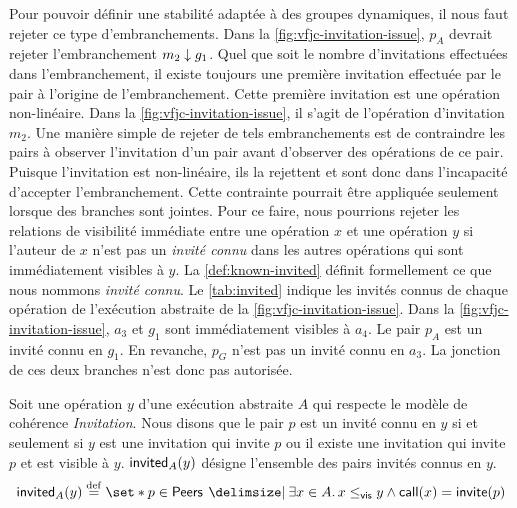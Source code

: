 Pour pouvoir définir une stabilité adaptée à des groupes dynamiques, il nous faut rejeter ce type d'embranchements.
Dans la \autoref{fig:vfjc-invitation-issue}, $p_A$ devrait rejeter l'embranchement $m_2 \downarrow g_1$.
Quel que soit le nombre d'invitations effectuées dans l'embranchement, il existe toujours une première invitation effectuée par le pair à l'origine de l'embranchement.
Cette première invitation est une opération non-linéaire.
Dans la \autoref{fig:vfjc-invitation-issue}, il s'agit de l'opération d'invitation $m_2$.
Une manière simple de rejeter de tels embranchements est de contraindre les pairs à observer l'invitation d'un pair avant d'observer des opérations de ce pair.
Puisque l'invitation est non-linéaire, ils la rejettent et sont donc dans l'incapacité d'accepter l'embranchement.
Cette contrainte pourrait être appliquée seulement lorsque des branches sont jointes.
Pour ce faire, nous pourrions rejeter les relations de visibilité immédiate entre une opération $x$ et une opération $y$ si l'auteur de $x$ n'est pas un \emph{invité connu} dans les autres opérations qui sont immédiatement visibles à $y$.
La \autoref{def:known-invited} définit formellement ce que nous nommons \emph{invité connu}.
Le \autoref{tab:invited} indique les invités connus de chaque opération de l'exécution abstraite de la \autoref{fig:vfjc-invitation-issue}.
Dans la \autoref{fig:vfjc-invitation-issue}, $a_3$ et $g_1$ sont immédiatement visibles à $a_4$.
Le pair $p_A$ est un invité connu en $g_1$.
En revanche, $p_G$ n'est pas un invité connu en $a_3$.
La jonction de ces deux branches n'est donc pas autorisée.

\begin{definition}\label{def:known-invited}
Soit une opération $y$ d'une exécution abstraite $A$ qui respecte le modèle de cohérence \emph{Invitation}.
Nous disons que le pair $p$ est un invité connu en $y$ si et seulement si $y$ est une invitation qui invite $p$ ou il existe une invitation qui invite $p$ et est visible à $y$.
$\operatorname{\mathsf{invited}}_A(y)$ désigne l'ensemble des pairs invités connus en $y$.
\begin{equation*}
    \trm{invited}_A(y) \defeq \set*{p \in \trm{Peers} \given \exists x \in A \qsep x \viseq y \land \trm{call}(x) = \trm{invite}(p)}
\end{equation*}
\end{definition}


